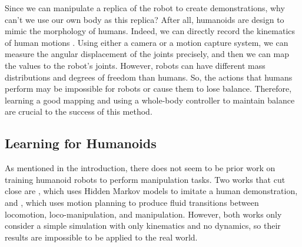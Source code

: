 Since we can manipulate a replica of the robot to create demonstrations, why can't we use our own body as this replica? After all, humanoids are design to mimic the morphology of humans. 
Indeed, we can directly record the kinematics of human motions \cite{Billard:2013}. Using either a camera or a motion capture system, we can measure the angular displacement of the joints precisely, and then we can map the values to the robot's joints. However, robots can have different mass distributions and degrees of freedom than humans. So, the actions that humans perform may be impossible for robots or cause them to lose balance. Therefore, learning a good mapping and using a whole-body controller to maintain balance are crucial to the success of this method.

\subsection{Learning for Humanoids}
As mentioned in the introduction, there does not seem to be prior work on training humanoid robots to perform manipulation tasks. 
Two works that cut close are \cite{4115578}, which uses Hidden Markov models to imitate a human demonstration, and \cite{7989550}, which uses motion planning to produce fluid transitions between locomotion, loco-manipulation, and manipulation. However, both works only consider a simple simulation with only kinematics and no dynamics, so their results are impossible to be applied to the real world.

